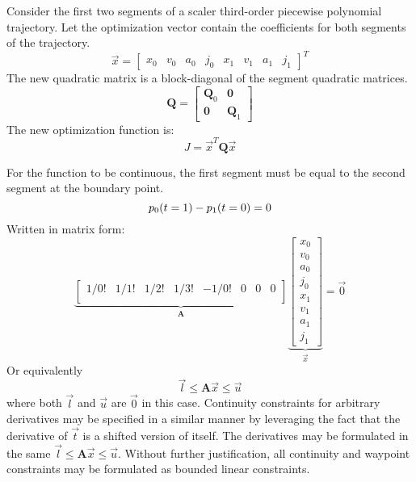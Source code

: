 \documentclass[12pt]{article}
\begin{document}
Consider the first two segments of a scaler third-order piecewise polynomial
trajectory. Let the optimization vector contain the coefficients for both
segments of the trajectory.
\begin{equation*}
  \vec{x} =
  \begin{bmatrix}
    x_{0} & v_{0} & a_{0} & j_{0} & x_{1} & v_{1} & a_{1} & j_{1}
  \end{bmatrix}^{T}
\end{equation*}
%
The new quadratic matrix is a block-diagonal of the segment quadratic matrices.
\begin{equation*}
  \mathbf{Q} = 
  \begin{bmatrix}
    \mathbf{Q}_{0} & \mathbf{0} \\
    \mathbf{0} & \mathbf{Q}_{1}
  \end{bmatrix}
\end{equation*}
%
The new optimization function is:
\begin{equation*}
  J = \vec{x}^T \mathbf{Q} \vec{x}
\end{equation*}

For the function to be continuous, the first segment must be equal to the second
segment at the boundary point.
\begin{equation*}
  p_{0}(t=1) - p_{1}(t=0) = 0 \\
\end{equation*}
%
Written in matrix form:
\begin{equation*}
  \underbrace{
  \begin{bmatrix}
    1/0! & 1/1! & 1/2! & 1/3! & -1/0! & 0 & 0 & 0 \\ 
  \end{bmatrix}
  }_{\mathbf{A}}
  \underbrace{
  \begin{bmatrix}
    x_{0} \\ 
    v_{0} \\
    a_{0} \\
    j_{0} \\
    x_{1} \\
    v_{1} \\
    a_{1} \\
    j_{1}
  \end{bmatrix}
  }_{\vec{x}}
  =
  \vec{0}
\end{equation*}
%
Or equivalently
\begin{equation*}
  \vec{l} \leq \mathbf{A} \vec{x} \leq \vec{u}
\end{equation*}
%
where both $\vec{l}$ and $\vec{u}$ are $\vec{0}$ in this case. Continuity
constraints for arbitrary derivatives may be specified in a similar manner by
leveraging the fact that the derivative of $\vec{t}$ is a shifted version of
itself. The derivatives may be formulated in the same $\vec{l} \leq \mathbf{A}
\vec{x} \leq \vec{u}$. Without further justification, all continuity and
waypoint constraints may be formulated as bounded linear constraints.
\end{document}

